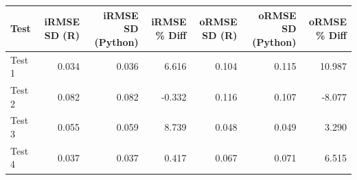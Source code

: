 
\begin{tabular}{l|r|r|r|r|r|r}
\hline
Test & iRMSE SD (R) & iRMSE SD (Python) & iRMSE \% Diff & oRMSE SD (R) & oRMSE SD (Python) & oRMSE \% Diff\\
\hline
Test 1 & 0.034 & 0.036 & 6.616 & 0.104 & 0.115 & 10.987\\
\hline
Test 2 & 0.082 & 0.082 & -0.332 & 0.116 & 0.107 & -8.077\\
\hline
Test 3 & 0.055 & 0.059 & 8.739 & 0.048 & 0.049 & 3.290\\
\hline
Test 4 & 0.037 & 0.037 & 0.417 & 0.067 & 0.071 & 6.515\\
\hline
\end{tabular}

